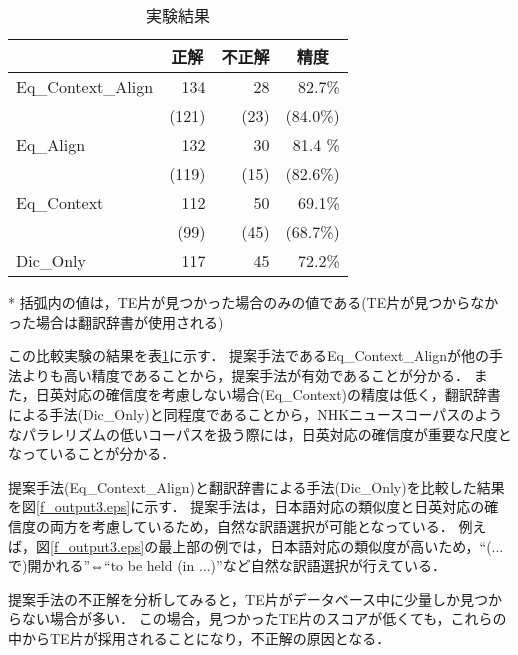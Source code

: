 \documentclass{nlp}
\begin{document}
\begin{table}
\caption{実験結果}
\label{実験結果}
\begin{center}
\begin{tabular}{lrrr}
\hline
 	 		& \multicolumn{1}{c}{正解}	
 	 		& \multicolumn{1}{c}{不正解}
 	 		& \multicolumn{1}{c}{精度}	\\
\hline                                                  
\hline                                                  
	{\sc Eq\_Context\_Align}	& 134	& 28	& 82.7\%	\\
					&(121)	& (23)	& (84.0\%)	\\
\hline                                                  
	{\sc Eq\_Align}			& 132	& 30	& 81.4 \%\\
					&(119)	& (15)	& (82.6\%)	\\
\hline                                                  
	{\sc Eq\_Context}		& 112	& 50	& 69.1\%	\\
					&(99)	& (45)	& (68.7\%)	\\
\hline                                                  
	{\sc Dic\_Only}			& 117	& 45	& 72.2\%	\\
\hline                                                  
\end{tabular}
\end{center}
\hfill{* 括弧内の値は，TE片が見つかった場合のみの値である(TE片が見つからなかった場合は翻訳辞書が使用される)}
\end{table}

この比較実験の結果を表\ref{実験結果}に示す．
提案手法である{\sc Eq\_Context\_Align}が他の手法よりも高い精度であることから，提案手法が有効であることが分かる．
また，日英対応の確信度を考慮しない場合({\sc Eq\_Context})の精度は低く，翻訳辞書による手法({\sc Dic\_Only})と同程度であることから，NHKニュースコーパスのようなパラレリズムの低いコーパスを扱う際には，日英対応の確信度が重要な尺度となっていることが分かる．

提案手法({\sc Eq\_Context\_Align})と翻訳辞書による手法({\sc Dic\_Only})を比較した結果を図\ref{f_output3.eps}に示す．
提案手法は，日本語対応の類似度と日英対応の確信度の両方を考慮しているため，自然な訳語選択が可能となっている．
例えば，図\ref{f_output3.eps}の最上部の例では，日本語対応の類似度が高いため，``(...で)開かれる''⇔``to be held (in ...)''など自然な訳語選択が行えている．

提案手法の不正解を分析してみると，TE片がデータベース中に少量しか見つからない場合が多い．
この場合，見つかったTE片のスコアが低くても，これらの中からTE片が採用されることになり，不正解の原因となる．
\end{document}
